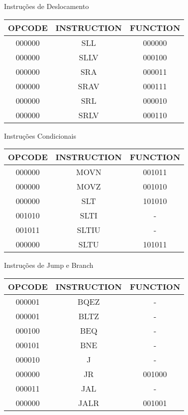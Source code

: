 Instruções de Deslocamento
\begin{table}[H]
\centering 	
  	\begin{tabular}{|c|c|c|}
  	\hline 
  	\cellcolor[gray]{0.9}\textbf{OPCODE} & \cellcolor[gray]{0.9}\textbf{INSTRUCTION} & \cellcolor[gray]{0.9}\textbf{FUNCTION} \\ 
  	\hline 
  	000000 & SLL & 000000\\ 
  	\hline 
  	000000 & SLLV & 000100\\ 
  	\hline 
  	000000 & SRA & 000011 \\ 
  	\hline 
  	000000 & SRAV & 000111 \\ 
  	\hline
  	000000 & SRL & 000010 \\ 
  	\hline 
  	000000 & SRLV & 000110 \\ 
  	\hline 
  	\end{tabular} 
\end{table}

Instruções Condicionais
\begin{table}[H]
\centering 	
  	\begin{tabular}{|c|c|c|}
  	\hline 
  \cellcolor[gray]{0.9}\textbf{OPCODE} & \cellcolor[gray]{0.9}\textbf{INSTRUCTION} & \cellcolor[gray]{0.9}\textbf{FUNCTION} \\ 
  	\hline  
  	000000 & MOVN & 001011 \\ 
  	\hline 
  	000000 & MOVZ & 001010 \\ 
  	\hline 
  	000000 & SLT & 101010 \\ 
  	\hline 
  	001010 & SLTI & -\\ 
  	\hline 
  	001011 & SLTIU & -\\ 
  	\hline 
  	000000 & SLTU & 101011 \\ 
  	\hline 
  	\end{tabular} 
\end{table}

Instruções de Jump e Branch
\begin{table}[H]
\centering 	
  	\begin{tabular}{|c|c|c|}
  	\hline 
  	 \cellcolor[gray]{0.9}\textbf{OPCODE} & \cellcolor[gray]{0.9}\textbf{INSTRUCTION} & \cellcolor[gray]{0.9}\textbf{FUNCTION} \\ 
  	\hline  
  	000001 & BQEZ &-\\ 
  	\hline 
  	000001 & BLTZ &-\\ 
  	\hline 
  	000100 & BEQ &-\\ 
  	\hline 
  	000101 & BNE &-\\ 
  	\hline 
  	000010 & J &-\\ 
  	\hline 
  	000000 & JR & 001000 \\ 
  	\hline
  	000011 & JAL &-\\ 
  	\hline
  	000000 & JALR & 001001 \\ 
  	\hline
  	
  	\end{tabular} 
\end{table}

